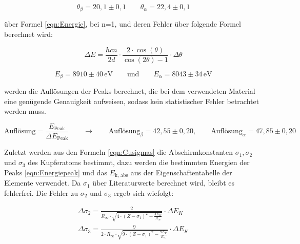 \documentclass[titlepage = firstcover]{scrartcl}
\begin{document}
            \begin{equation*}
              \theta_{\beta} = 20,1 \pm 0,1     \qquad \theta_{\alpha} = 22,4 \pm 0,1
            \end{equation*}

            \noindent
            über Formel \ref{eqn:Energie}, bei n=1, und deren Fehler über folgende Formel berechnet wird:

            \begin{equation*}
              \Delta E = \frac{hcn}{2d} \cdot \frac{2 \cdot \cos(\theta)}{\cos(2\theta)-1} \cdot \Delta \theta
            \end{equation*}
            
            \begin{equation}
              E_{\beta} = 8910 \pm 40 \, \text{eV} \qquad \text{und} \qquad E_{\alpha} = 8043 \pm 34\, \text{eV}
              \label{eqn:Energiepeak}
            \end{equation}
            
            \noindent
            werden die Auflösungen der Peaks berechnet, die bei dem verwendeten Material eine genügende Genauigkeit aufweisen, sodass kein statistischer Fehler betrachtet werden muss.

            \begin{equation}
              \text{Auflösung} = \frac{E_{\text{Peak}}}{\Delta E_{\text{Peak}}} \qquad \longrightarrow \qquad \text{Auflösung}_{\beta} = 42,55 \pm 0,20 , \qquad \text{Auflösung}_{\alpha} = 47,85 \pm 0,20
            \end{equation}
            
            \noindent
            Zuletzt werden aus den Formeln \ref{eqn:Cusigmas} die Abschirmkonstanten $\sigma_1, \sigma_2$ und $\sigma_3$ des Kupferatoms bestimmt, dazu werden die bestimmten Energien der Peaks
            \ref{eqn:Energiepeak} und das $E_{\text{k, abs}}$ aus der Eigenschaftentabelle der Elemente verwendet. Da $\sigma_1$ über Literaturwerte berechnet wird, bleibt es fehlerfrei. Die Fehler zu
            $\sigma_2$ und $\sigma_3$ ergeb sich wiefolgt:

            \begin{align*}
              \Delta \sigma_2 = \frac{2}{R_{\infty} \cdot \sqrt{4 \cdot \left(Z - \sigma_1 \right)^2 - \frac{4E_K}{R_{\infty}}}} \cdot \Delta E_K \\
              \Delta \sigma_3 = \frac{9}{2 \cdot R_{\infty} \cdot \sqrt{9 \cdot \left(Z - \sigma_1 \right)^2 - \frac{9E_K}{R_{\infty}}}} \cdot \Delta E_K
            \end{align*}
            
\end{document}

